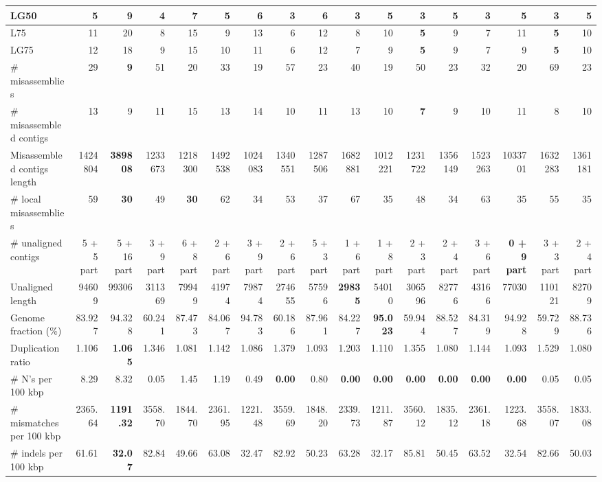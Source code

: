 \documentclass[12pt,a4paper]{article}
\begin{document}
\begin{table}[ht]
\begin{center}
\begin{tabular}{|l*{16}{|r}|}
LG50 & 5 & 9 & 4 & 7 & 5 & 6 & {\bf 3} & 6 & {\bf 3} & 5 & {\bf 3} & 5 & {\bf 3} & 5 & {\bf 3} & 5 \\ \hline
L75 & 11 & 20 & 8 & 15 & 9 & 13 & 6 & 12 & 8 & 10 & {\bf 5} & 9 & 7 & 11 & {\bf 5} & 10 \\ \hline
LG75 & 12 & 18 & 9 & 15 & 10 & 11 & 6 & 12 & 7 & 9 & {\bf 5} & 9 & 7 & 9 & {\bf 5} & 10 \\ \hline
\# misassemblies & 29 & {\bf 9} & 51 & 20 & 33 & 19 & 57 & 23 & 40 & 19 & 50 & 23 & 32 & 20 & 69 & 23 \\ \hline
\# misassembled contigs & 13 & 9 & 11 & 15 & 13 & 14 & 10 & 11 & 13 & 10 & {\bf 7} & 9 & 10 & 11 & 8 & 10 \\ \hline
Misassembled contigs length & 1424804 & {\bf 389808} & 1233673 & 1218300 & 1492538 & 1024083 & 1340551 & 1287506 & 1682881 & 1012221 & 1231722 & 1356149 & 1523263 & 1033701 & 1632283 & 1361181 \\ \hline
\# local misassemblies & 59 & {\bf 30} & 49 & {\bf 30} & 62 & 34 & 53 & 37 & 67 & 35 & 48 & 34 & 63 & 35 & 55 & 35 \\ \hline
\# unaligned contigs & 5 + 5 part & 5 + 16 part & 3 + 9 part & 6 + 8 part & 2 + 6 part & 3 + 9 part & 2 + 6 part & 5 + 3 part & 1 + 6 part & 1 + 8 part & 2 + 3 part & 2 + 4 part & 3 + 6 part & {\bf 0 + 9 part} & 3 + 3 part & 2 + 4 part \\ \hline
Unaligned length & 94609 & 99306 & 311369 & 79949 & 41974 & 79874 & 274655 & 57596 & {\bf 29835} & 54010 & 306596 & 82776 & 43166 & 77030 & 110121 & 82709 \\ \hline
Genome fraction (\%) & 83.927 & 94.328 & 60.241 & 87.473 & 84.067 & 94.783 & 60.186 & 87.961 & 84.227 & {\bf 95.023} & 59.944 & 88.527 & 84.319 & 94.928 & 59.729 & 88.736 \\ \hline
Duplication ratio & 1.106 & {\bf 1.065} & 1.346 & 1.081 & 1.142 & 1.086 & 1.379 & 1.093 & 1.203 & 1.110 & 1.355 & 1.080 & 1.144 & 1.093 & 1.529 & 1.080 \\ \hline
\# N's per 100 kbp & 8.29 & 8.32 & 0.05 & 1.45 & 1.19 & 0.49 & {\bf 0.00} & 0.80 & {\bf 0.00} & {\bf 0.00} & {\bf 0.00} & {\bf 0.00} & {\bf 0.00} & {\bf 0.00} & 0.05 & 0.05 \\ \hline
\# mismatches per 100 kbp & 2365.64 & {\bf 1191.32} & 3558.70 & 1844.70 & 2361.95 & 1221.48 & 3559.69 & 1848.20 & 2339.73 & 1211.87 & 3560.12 & 1835.12 & 2361.18 & 1223.68 & 3558.07 & 1833.08 \\ \hline
\# indels per 100 kbp & 61.61 & {\bf 32.07} & 82.84 & 49.66 & 63.08 & 32.47 & 82.92 & 50.23 & 63.28 & 32.17 & 85.81 & 50.45 & 63.52 & 32.54 & 82.66 & 50.03 \\ \hline

\end{tabular}
\end{center}
\end{table}
\end{document}
